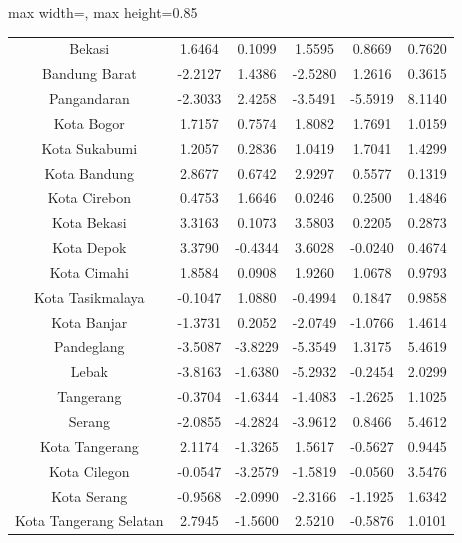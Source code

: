 \begin{table}[H]
\begin{adjustbox}{max width=\textwidth, max height=0.85\textheight}
\begin{tabular}{|c|c|c|c|c|c|}
Bekasi & 1.6464 & 0.1099 & 1.5595 & 0.8669 & 0.7620 \\
Bandung Barat & -2.2127 & 1.4386 & -2.5280 & 1.2616 & 0.3615 \\
Pangandaran & -2.3033 & 2.4258 & -3.5491 & -5.5919 & 8.1140 \\
Kota Bogor & 1.7157 & 0.7574 & 1.8082 & 1.7691 & 1.0159 \\
Kota Sukabumi & 1.2057 & 0.2836 & 1.0419 & 1.7041 & 1.4299 \\
Kota Bandung & 2.8677 & 0.6742 & 2.9297 & 0.5577 & 0.1319 \\
Kota Cirebon & 0.4753 & 1.6646 & 0.0246 & 0.2500 & 1.4846 \\
Kota Bekasi & 3.3163 & 0.1073 & 3.5803 & 0.2205 & 0.2873 \\
Kota Depok & 3.3790 & -0.4344 & 3.6028 & -0.0240 & 0.4674 \\
Kota Cimahi & 1.8584 & 0.0908 & 1.9260 & 1.0678 & 0.9793 \\
Kota Tasikmalaya & -0.1047 & 1.0880 & -0.4994 & 0.1847 & 0.9858 \\
Kota Banjar & -1.3731 & 0.2052 & -2.0749 & -1.0766 & 1.4614 \\
Pandeglang & -3.5087 & -3.8229 & -5.3549 & 1.3175 & 5.4619 \\
Lebak & -3.8163 & -1.6380 & -5.2932 & -0.2454 & 2.0299 \\
Tangerang & -0.3704 & -1.6344 & -1.4083 & -1.2625 & 1.1025 \\
Serang & -2.0855 & -4.2824 & -3.9612 & 0.8466 & 5.4612 \\
Kota Tangerang & 2.1174 & -1.3265 & 1.5617 & -0.5627 & 0.9445 \\
Kota Cilegon & -0.0547 & -3.2579 & -1.5819 & -0.0560 & 3.5476 \\
Kota Serang & -0.9568 & -2.0990 & -2.3166 & -1.1925 & 1.6342 \\
Kota Tangerang Selatan & 2.7945 & -1.5600 & 2.5210 & -0.5876 & 1.0101 \\
\hline
\end{tabular}
\end{adjustbox}
\end{table}
